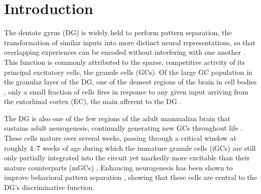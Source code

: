 \documentclass[pdflatex,sn-basic]{sn-jnl}%
\theoremstyle{thmstyleone}%
\theoremstyle{thmstyletwo}%
\theoremstyle{thmstylethree}%
\begin{document}


\maketitle

\section{Introduction}\label{introduction}

The dentate gyrus (DG) is widely held to perform pattern separation, the transformation of similar inputs into more distinct
neural representations, so that overlapping experiences can be encoded without interfering with one another
\citep{yassaPattern2011, rollsMechanisms2013, hainmuellerDentate2020}. This function is commonly attributed to the sparse,
competitive activity of its principal excitatory cells, the granule cells (GCs). Of the large GC population in the granular layer
of the DG, one of the densest regions of the brain in cell bodies \citep{amaralDentate2007}, only a small fraction of cells fires
in response to any given input arriving from the entorhinal cortex (EC), the main afferent to the DG \citep{kesnerMnemonic2006,
chavlisDendrites2017}.

The DG is also one of the few regions of the adult mammalian brain that sustains adult neurogenesis, continually generating new
GCs throughout life \citep{altmanAutoradiographic1965, mingAdult2011}. These cells mature over several weeks, passing through a
critical window at roughly 4--7 weeks of age during which the immature granule cells (iGCs) are still only partially integrated
into the circuit yet markedly more excitable than their mature counterparts (mGCs) \citep{espositoNeuronal2005,
aimoneRegulation2014, denoth-lippunerFormation2021}. Enhancing neurogenesis has been shown to improve behavioral pattern
separation \citep{sahayIncreasing2011}, showing that these cells are central to the DG's discriminative function.
\end{document}
